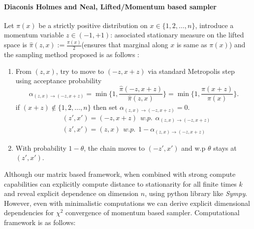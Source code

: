 \documentclass[preprint]{imsart}
\theoremstyle{plain}
\theoremstyle{definition}
\begin{document}
\paragraph{Diaconis Holmes and Neal, Lifted/Momentum based sampler \cite{diaconis2000analysis}} 
\label{para:diac_algo}
 Let $\pi(x)$ be a strictly positive distribution on $x \in \{1,2,\ldots,n\}$, introduce a momentum variable $z \in (-1,+1)$: associated stationary measure on the lifted space is $\hat{\pi}(z,x):=\frac{\pi(x)}{2}$(ensures that marginal along $x$ is same as $\pi(x)$) and the sampling method proposed is as follows :
    \begin{enumerate}
        \item From $(z,x)$, try to move to $(-z,x+z)$ via standard Metropolis step using acceptance probability
        \begin{equation}
            \nonumber \alpha_{(z,x)\rightarrow(-z,x+z)} = \min \Big\{1,\frac{\hat{\pi}(-z,x+z)}{\hat{\pi}(z,x)}\Big\}=\min\Big\{1,\frac{\pi(x+z)}{\pi(x)}\Big\}.
        \end{equation}
        if $(x+z) \not \in \{1,2,\ldots,n\}$ then set $\alpha_{(z,x)\rightarrow(-z,x+z)}=0$. 
        \begin{align}
            & \nonumber (z',x') = (-z,x+z) \hspace{5pt} \textit{w.p.} \hspace{5pt} \alpha_{(z,x)\rightarrow(-z,x+z)} \\ & \nonumber (z',x')=(z,x)  \hspace{5pt} \textit{w.p.} \hspace{5pt} 1-\alpha_{(z,x)\rightarrow(-z,x+z)}
        \end{align}
        \item With probability $1-\theta$, the chain moves to $(-z',x')$ and w.p $\theta$ stays at $(z',x')$.   
    \end{enumerate}
Although our matrix based framework, when combined with strong compute capabilities can explicitly compute distance to stationarity for all finite times $k$ and reveal explicit dependence on dimension $n$, using python library like \emph{Sympy}. However, even with minimalistic computations we can derive explicit dimensional dependencies for $\chi^{2}$ convergence of momentum based sampler. Computational framework is as follows:
\end{document}
